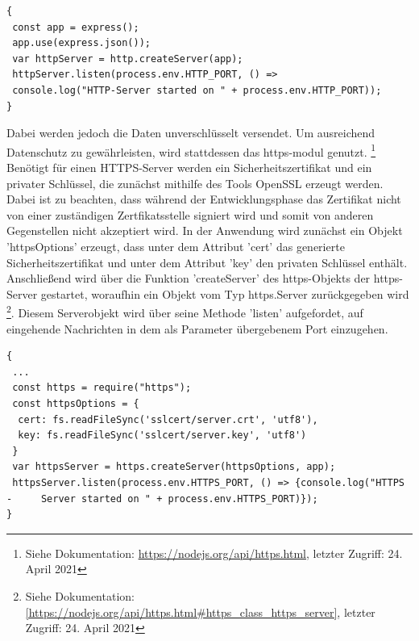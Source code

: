 \begin{lstlisting}[caption=Einfache Verbindung, label=lst:nodejs_easyconnection]
{
 const app = express();
 app.use(express.json()); 
 var httpServer = http.createServer(app);
 httpServer.listen(process.env.HTTP_PORT, () => 
 console.log("HTTP-Server started on " + process.env.HTTP_PORT));
}
\end{lstlisting}

\noindent
Dabei werden jedoch die Daten unverschlüsselt versendet. Um ausreichend Datenschutz zu gewährleisten, wird stattdessen das https-modul genutzt. \footnote{Siehe Dokumentation: \url{https://nodejs.org/api/https.html}, letzter Zugriff: 24. April 2021}
\newline
Benötigt für einen HTTPS-Server werden ein Sicherheitszertifikat und ein privater Schlüssel, die zunächst mithilfe des Tools OpenSSL erzeugt werden.  
Dabei ist zu beachten, dass während der Entwicklungsphase das Zertifikat nicht von einer zuständigen Zertfikatsstelle signiert wird und somit von anderen Gegenstellen nicht akzeptiert wird.
\newline
In der Anwendung wird zunächst ein Objekt 'httpsOptions' erzeugt, dass unter dem Attribut 'cert' das generierte Sicherheitszertifikat und unter dem Attribut 'key' den privaten Schlüssel enthält. Anschließend wird über die Funktion 'createServer' des https-Objekts der https-Server gestartet, woraufhin ein Objekt vom Typ https.Server zurückgegeben wird \footnote{Siehe Dokumentation:  \url{[https://nodejs.org/api/https.html\#https_class_https_server]}, letzter Zugriff: 24. April 2021}. 
Diesem Serverobjekt wird über seine Methode 'listen' aufgefordet, auf eingehende Nachrichten in dem als Parameter übergebenem Port einzugehen.\\

\begin{lstlisting}[caption=Gesicherte Verbindung, label=lst:nodejs_safeconnection]
{
 ...
 const https = require("https");
 const httpsOptions = {
  cert: fs.readFileSync('sslcert/server.crt', 'utf8'),
  key: fs.readFileSync('sslcert/server.key', 'utf8')
 }
 var httpsServer = https.createServer(httpsOptions, app);
 httpsServer.listen(process.env.HTTPS_PORT, () => {console.log("HTTPS - 	Server started on " + process.env.HTTPS_PORT)});
}
\end{lstlisting}


